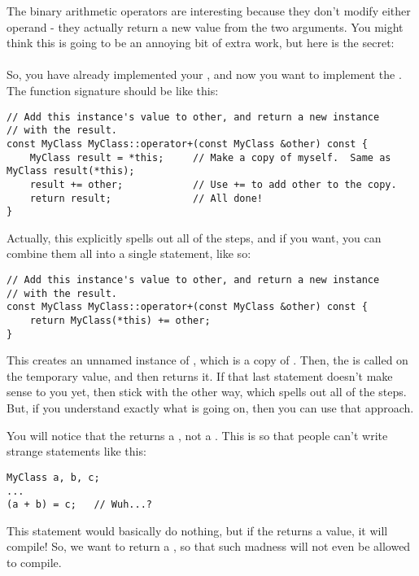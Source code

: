 The binary arithmetic operators are interesting because they don't modify either operand - they actually return a new value from the two arguments. You might think this is going to be an annoying bit of extra work, but here is the secret:\\

\\

So, you have already implemented your , and now you want to implement the . The function signature should be like this:

\begin{verbatim}
// Add this instance's value to other, and return a new instance
// with the result.
const MyClass MyClass::operator+(const MyClass &other) const {
    MyClass result = *this;     // Make a copy of myself.  Same as MyClass result(*this);
    result += other;            // Use += to add other to the copy.
    return result;              // All done!
}
\end{verbatim}

Actually, this explicitly spells out all of the steps, and if you want, you can combine them all into a single statement, like so:

\begin{verbatim}
// Add this instance's value to other, and return a new instance
// with the result.
const MyClass MyClass::operator+(const MyClass &other) const {
    return MyClass(*this) += other;
}
\end{verbatim}

This creates an unnamed instance of , which is a copy of . Then, the  is called on the temporary value, and then returns it. If that last statement doesn't make sense to you yet, then stick with the other way, which spells out all of the steps. But, if you understand exactly what is going on, then you can use that approach.

You will notice that the  returns a , not a . This is so that people can't write strange statements like this:

\begin{verbatim}
MyClass a, b, c;
...
(a + b) = c;   // Wuh...?
\end{verbatim}

This statement would basically do nothing, but if the  returns a  value, it will compile! So, we want to return a , so that such madness will not even be allowed to compile.\\

